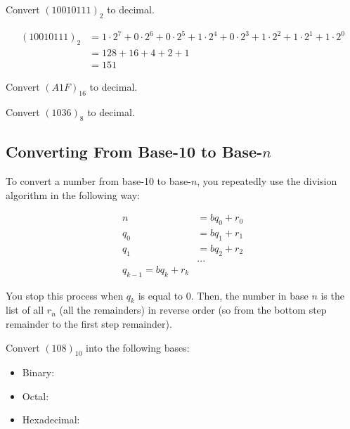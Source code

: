 \begin{problem}
    Convert $(10010111)_2$ to decimal.

    $$
    \begin{aligned}
        (10010111)_2 &= 1 \cdot 2^7 + 0 \cdot 2 ^6 + 0 \cdot 2 ^5 + 1 \cdot 2 ^4 + 0 \cdot 2 ^3 + 1 \cdot 2 ^2 + 1 \cdot 2 ^1 + 1 \cdot 2 ^0\\
        &= 128 + 16 + 4 + 2 + 1\\
        &= 151
    \end{aligned}
    $$
\end{problem}


\begin{problem}
    Convert $(A1F)_{16}$ to decimal.
\end{problem}


\begin{problem}
    Convert $(1036)_8$ to decimal.
\end{problem}


\subsection{Converting From Base-10 to Base-$n$}


To convert a number from base-10 to base-$n$, you repeatedly use the division algorithm in the following way:

$$
\begin{aligned}
    n &= bq_0 + r_0\\
    q_0 &= bq_1 + r_1\\
    q_1 &= bq_2 + r_2\\
    &...\\
    q_{k-1} = bq_k + r_k
\end{aligned}
$$

You stop this process when $q_k$ is equal to 0. Then, the number in base $n$ is the list of all $r_n$ (all the remainders) in reverse order (so from the bottom step remainder to the first step remainder).

\begin{problem}
    Convert $(108)_10$ into the following bases:

    \begin{itemize}
        \item Binary:
        \item Octal:
        \item Hexadecimal:
    \end{itemize}
\end{problem}


